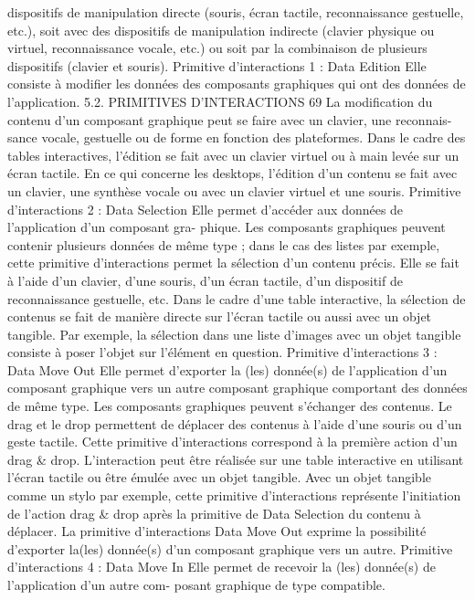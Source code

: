 \documentclass{article}
\begin{document}
dispositifs de manipulation directe (souris, écran tactile, reconnaissance gestuelle, etc.), soit avec des
dispositifs de manipulation indirecte (clavier physique ou virtuel, reconnaissance vocale, etc.) ou soit
par la combinaison de plusieurs dispositifs (clavier et souris).
Primitive d’interactions 1 : Data Edition
Elle consiste à modiﬁer les données des composants graphiques qui ont des
données de l’application.
5.2. PRIMITIVES D’INTERACTIONS
69
La modiﬁcation du contenu d’un composant graphique peut se faire avec un clavier, une reconnais-
sance vocale, gestuelle ou de forme en fonction des plateformes. Dans le cadre des tables interactives,
l’édition se fait avec un clavier virtuel ou à main levée sur un écran tactile. En ce qui concerne les
desktops, l’édition d’un contenu se fait avec un clavier, une synthèse vocale ou avec un clavier virtuel
et une souris.
Primitive d’interactions 2 : Data Selection
Elle permet d’accéder aux données de l’application d’un composant gra-
phique.
Les composants graphiques peuvent contenir plusieurs données de même type ; dans le cas des listes
par exemple, cette primitive d’interactions permet la sélection d’un contenu précis. Elle se fait à
l’aide d’un clavier, d’une souris, d’un écran tactile, d’un dispositif de reconnaissance gestuelle, etc.
Dans le cadre d’une table interactive, la sélection de contenus se fait de manière directe sur l’écran
tactile ou aussi avec un objet tangible. Par exemple, la sélection dans une liste d’images avec un objet
tangible consiste à poser l’objet sur l’élément en question.
Primitive d’interactions 3 : Data Move Out
Elle permet d’exporter la (les) donnée(s) de l’application d’un composant
graphique vers un autre composant graphique comportant des données de même
type.
Les composants graphiques peuvent s’échanger des contenus. Le drag et le drop permettent de
déplacer des contenus à l’aide d’une souris ou d’un geste tactile. Cette primitive d’interactions
correspond à la première action d’un drag & drop. L’interaction peut être réalisée sur une table
interactive en utilisant l’écran tactile ou être émulée avec un objet tangible. Avec un objet tangible
comme un stylo par exemple, cette primitive d’interactions représente l’initiation de l’action drag &
drop après la primitive de Data Selection du contenu à déplacer. La primitive d’interactions Data
Move Out exprime la possibilité d’exporter la(les) donnée(s) d’un composant graphique vers un autre.
Primitive d’interactions 4 : Data Move In
Elle permet de recevoir la (les) donnée(s) de l’application d’un autre com-
posant graphique de type compatible.
\end{document}
